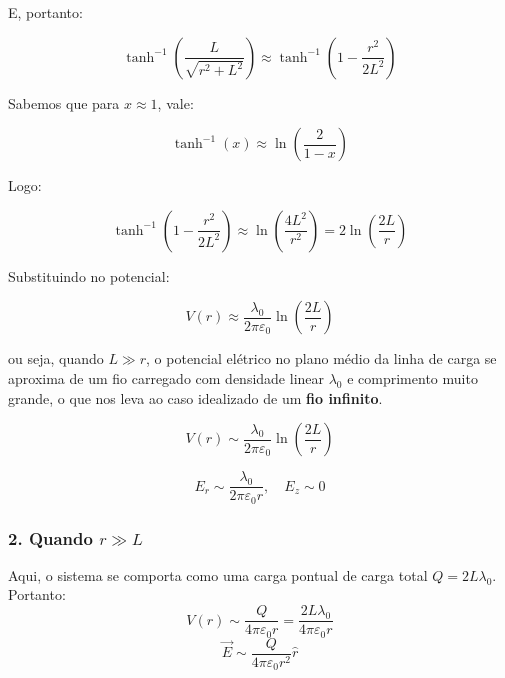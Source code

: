 \documentclass[a4paper,12pt]{article}
\begin{document}
E, portanto:

\begin{equation}
\tanh^{-1} \left( \frac{L}{\sqrt{r^2 + L^2}} \right) \approx \tanh^{-1} \left( 1 - \frac{r^2}{2L^2} \right)
\end{equation}

Sabemos que para $x \approx 1$, vale:

\begin{equation}
\tanh^{-1}(x) \approx \ln \left( \frac{2}{1 - x} \right)
\end{equation}

Logo:

\begin{equation}
\tanh^{-1} \left( 1 - \frac{r^2}{2L^2} \right) \approx \ln \left( \frac{4L^2}{r^2} \right) = 2 \ln \left( \frac{2L}{r} \right)
\end{equation}

Substituindo no potencial:

\begin{equation}
V(r) \approx \frac{\lambda_0}{2\pi \varepsilon_0} \ln \left( \frac{2L}{r} \right)
\end{equation}

ou seja, quando $L \gg r$, o potencial elétrico no plano médio da linha de carga se aproxima de 
um fio carregado com densidade linear $\lambda_0$ e comprimento muito grande, o que nos leva 
ao caso idealizado de um \textbf{fio infinito}.

\begin{equation}
\boxed{
V(r) \sim \frac{\lambda_0}{2\pi\varepsilon_0} \ln\left(\frac{2L}{r}\right)
}
\end{equation}

\begin{equation}
\boxed{
E_r \sim \frac{\lambda_0}{2\pi\varepsilon_0 r}, \quad E_z \sim 0
}
\end{equation}

\subsubsection*{2. Quando \( r \gg L \)}

Aqui, o sistema se comporta como uma carga pontual de carga total \( Q = 2L\lambda_0 \). Portanto:
\begin{equation}
\boxed{
V(r) \sim \frac{Q}{4\pi\varepsilon_0 r} = \frac{2L\lambda_0}{4\pi\varepsilon_0 r}
}
\end{equation}
\begin{equation}
\boxed{
\vec{E} \sim \frac{Q}{4\pi\varepsilon_0 r^2} \hat{r}
}
\end{equation}
\end{document}
